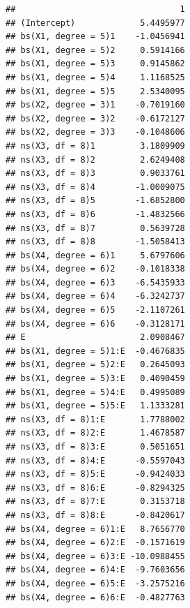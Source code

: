 \documentclass[12pt,letter]{article}\usepackage[]{graphicx}\usepackage[]{color}
\makeatletter
\newenvironment{kframe}{%
 \def\at@end@of@kframe{}%
 \ifinner\ifhmode%
  \def\at@end@of@kframe{\end{minipage}}%
  \begin{minipage}{\columnwidth}%
 \fi\fi%
 \def\FrameCommand##1{\hskip\@totalleftmargin \hskip-\fboxsep
 \colorbox{shadecolor}{##1}\hskip-\fboxsep
     \hskip-\linewidth \hskip-\@totalleftmargin \hskip\columnwidth}%
 \MakeFramed {\advance\hsize-\width
   \@totalleftmargin\z@ \linewidth\hsize
   \@setminipage}}%
 {\par\unskip\endMakeFramed%
 \at@end@of@kframe}
\newenvironment{knitrout}{}{} %
\makeatother
\begin{document}
\begin{knitrout}\scriptsize
{}\color{fgcolor}\begin{kframe}
\begin{verbatim}
##                                 1
## (Intercept)             5.4495977
## bs(X1, degree = 5)1    -1.0456941
## bs(X1, degree = 5)2     0.5914166
## bs(X1, degree = 5)3     0.9145862
## bs(X1, degree = 5)4     1.1168525
## bs(X1, degree = 5)5     2.5340095
## bs(X2, degree = 3)1    -0.7019160
## bs(X2, degree = 3)2    -0.6172127
## bs(X2, degree = 3)3    -0.1048606
## ns(X3, df = 8)1         3.1809909
## ns(X3, df = 8)2         2.6249408
## ns(X3, df = 8)3         0.9033761
## ns(X3, df = 8)4        -1.0009075
## ns(X3, df = 8)5        -1.6852800
## ns(X3, df = 8)6        -1.4832566
## ns(X3, df = 8)7         0.5639728
## ns(X3, df = 8)8        -1.5058413
## bs(X4, degree = 6)1     5.6797606
## bs(X4, degree = 6)2    -0.1018338
## bs(X4, degree = 6)3    -6.5435933
## bs(X4, degree = 6)4    -6.3242737
## bs(X4, degree = 6)5    -2.1107261
## bs(X4, degree = 6)6    -0.3128171
## E                       2.0908467
## bs(X1, degree = 5)1:E  -0.4676835
## bs(X1, degree = 5)2:E   0.2645093
## bs(X1, degree = 5)3:E   0.4090459
## bs(X1, degree = 5)4:E   0.4995089
## bs(X1, degree = 5)5:E   1.1333281
## ns(X3, df = 8)1:E       1.7788002
## ns(X3, df = 8)2:E       1.4678587
## ns(X3, df = 8)3:E       0.5051651
## ns(X3, df = 8)4:E      -0.5597043
## ns(X3, df = 8)5:E      -0.9424033
## ns(X3, df = 8)6:E      -0.8294325
## ns(X3, df = 8)7:E       0.3153718
## ns(X3, df = 8)8:E      -0.8420617
## bs(X4, degree = 6)1:E   8.7656770
## bs(X4, degree = 6)2:E  -0.1571619
## bs(X4, degree = 6)3:E -10.0988455
## bs(X4, degree = 6)4:E  -9.7603656
## bs(X4, degree = 6)5:E  -3.2575216
## bs(X4, degree = 6)6:E  -0.4827763
\end{verbatim}
\end{kframe}
\end{knitrout}
\end{document}
